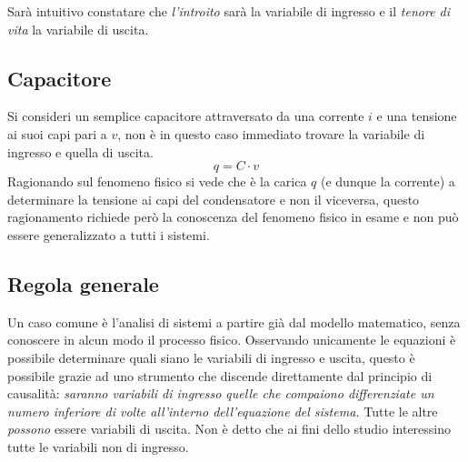 Sarà intuitivo constatare che \textit{l'introito} sarà la variabile di ingresso e il \textit{tenore
di vita} la variabile di uscita.

\subsection{Capacitore}
Si consideri un semplice capacitore attraversato da una corrente $i$ e una tensione ai suoi capi
pari a $v$, non è in questo caso immediato trovare la variabile di ingresso e quella di uscita.
$$
q = C\cdot v
$$
Ragionando sul fenomeno fisico si vede che è la carica $q$ (e dunque la corrente) a determinare la
tensione ai capi del condensatore e non il viceversa, questo ragionamento richiede però la
conoscenza del fenomeno fisico in esame e non può essere generalizzato a tutti i sistemi.

\subsection{Regola generale}
Un caso comune è l'analisi di sistemi a partire già dal modello matematico, senza conoscere in
alcun modo il processo fisico.
Osservando unicamente le equazioni è possibile determinare quali siano le variabili di ingresso e
uscita, questo è possibile grazie ad uno strumento che discende direttamente dal principio di
causalità:\newline
\emph{saranno variabili di ingresso quelle che compaiono differenziate un numero
inferiore di volte all'interno dell'equazione del sistema.}
\newline
Tutte le altre \textit{possono} essere variabili di uscita.
Non è detto che ai fini dello studio interessino tutte le variabili non di ingresso.
